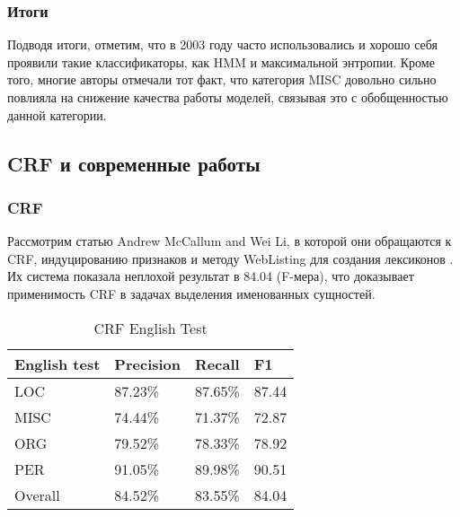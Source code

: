 \subsubsection{Итоги}

Подводя итоги, отметим, что в 2003 году часто использовались и хорошо себя проявили такие классификаторы, как HMM и максимальной энтропии. Кроме того, многие авторы отмечали тот факт, что категория MISC довольно сильно повлияла на снижение качества работы моделей, связывая это с обобщенностью данной категории.

\subsection{CRF и современные работы}
\subsubsection{CRF}

Рассмотрим статью Andrew McCallum and Wei Li, в которой они обращаются к CRF, индуцированию признаков и методу WebListing для создания лексиконов \cite{McCallum:2003:ERN:1119176.1119206}. Их система показала неплохой результат в 84.04 (F-мера), что доказывает применимость CRF в задачах выделения именованных сущностей.

\begin{table}[ht]
\centering
\caption{CRF English Test}
\label{crf_eng}
\begin{tabular}{|l|l|l|l|}
\hline
\textbf{English test} & \textbf{Precision} & \textbf{Recall} & \textbf{F1} \\ \hline
LOC                   & 87.23\%            & 87.65\%         & 87.44       \\ \hline
MISC                  & 74.44\%            & 71.37\%         & 72.87       \\ \hline
ORG                   & 79.52\%            & 78.33\%         & 78.92       \\ \hline
PER                   & 91.05\%            & 89.98\%         & 90.51       \\ \hline
Overall               & 84.52\%            & 83.55\%         & 84.04       \\ \hline
\end{tabular}
\end{table}

